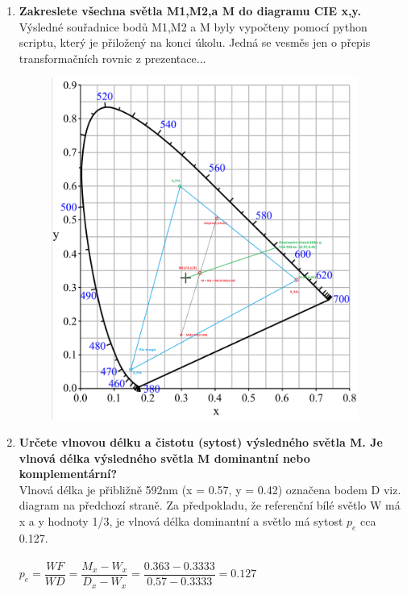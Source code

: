 \documentclass[10pt, a4paper]{article}%
\begin{document}
		\begin{enumerate}
			\item \textbf{Zakreslete všechna světla M1,M2,a M do diagramu CIE x,y.}\\
			Výsledné souřadnice bodů M1,M2 a M byly vypočteny pomocí python scriptu, který je přiložený na konci úkolu. Jedná se vesměs jen o přepis transformačních rovnic
			z prezentace...
			\begin{figure}[ht!]
				\centering
				\includegraphics[width=0.95\textwidth]{CIE_diagram.png}
			\end{figure}
			
			\clearpage
			\item \textbf{Určete vlnovou délku a čistotu (sytost) výsledného světla M. Je vlnová délka výsledného světla M dominantní nebo komplementární?}\\
			Vlnová délka je přibližně 592nm (x = 0.57, y = 0.42) označena bodem D viz. diagram na předchozí straně. Za předpokladu, že referenční bílé světlo W
			má x a y hodnoty 1/3, je vlnová délka dominantní a světlo má sytost $p_e$ cca 0.127.\\\\
			$p_e = \dfrac{WF}{WD} = \dfrac{M_x - W_x}{D_x - W_x} = \dfrac{0.363-0.3333}{0.57 - 0.3333} = 0.127$\\


\end{enumerate}
\end{document}
